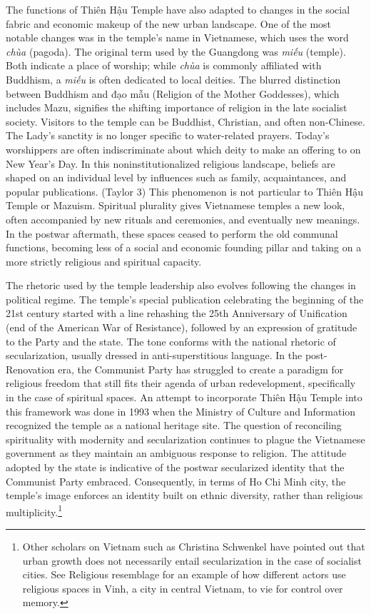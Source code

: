 The functions of Thiên Hậu Temple have also adapted to changes in the social fabric and economic makeup of the new urban landscape. One of the most notable changes was in the temple's name in Vietnamese, which uses the word \textit{chùa} (pagoda). The original term used by the Guangdong was \textit{miếu} (temple). Both indicate a place of worship; while \textit{chùa} is commonly affiliated with Buddhism, a \textit{miếu} is often dedicated to local deities. The blurred distinction between Buddhism and đạo mẫu (Religion of the Mother Goddesses), which includes Mazu, signifies the shifting importance of religion in the late socialist society. Visitors to the temple can be Buddhist, Christian, and often non-Chinese. The Lady’s sanctity is no longer specific to water-related prayers. Today’s worshippers are often indiscriminate about which deity to make an offering to on New Year’s Day. In this noninstitutionalized religious landscape, beliefs are shaped on an individual level by influences such as family, acquaintances, and popular publications. (Taylor 3) This phenomenon is not particular to Thiên Hậu Temple or Mazuism. Spiritual plurality gives Vietnamese temples a new look, often accompanied by new rituals and ceremonies, and eventually new meanings. In the postwar aftermath, these spaces ceased to perform the old communal functions, becoming less of a social and economic founding pillar and taking on a more strictly religious and spiritual capacity.

The rhetoric used by the temple leadership also evolves following the changes in political regime. The temple's special publication celebrating the beginning of the 21st century started with a line rehashing the 25th Anniversary of Unification (end of the American War of Resistance), followed by an expression of gratitude to the Party and the state.  The tone conforms with the national rhetoric of secularization, usually dressed in anti-superstitious language. In the post-Renovation era, the Communist Party has struggled to create a paradigm for religious freedom that still fits their agenda of urban redevelopment, specifically in the case of spiritual spaces.  An attempt to incorporate Thiên Hậu Temple into this framework was done in 1993 when the Ministry of Culture and Information recognized the temple as a national heritage site. The question of reconciling spirituality with modernity and secularization continues to plague the Vietnamese government as they maintain an ambiguous response to religion. The attitude adopted by the state is indicative of the postwar secularized identity that the Communist Party embraced. Consequently, in terms of Ho Chi Minh city, the temple's image enforces an identity built on ethnic diversity, rather than religious multiplicity.\footnote{Other scholars on Vietnam such as Christina Schwenkel have pointed out that urban growth does not necessarily entail secularization in the case of socialist cities. See Religious resemblage for an example of how different actors use religious spaces in Vinh, a city in central Vietnam, to vie for control over memory.}

